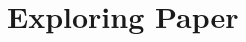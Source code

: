 \documentclass{sig-alternate}
\begin{document}




\section{Exploring Paper}
\label{sec:exploring-paper}
\end{document}
